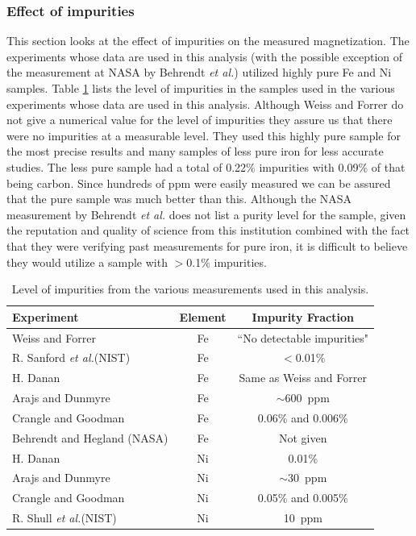 \documentclass[12pt]{article}
\begin{document}
\subsubsection{Effect of impurities}
This section looks at the effect of impurities on the measured magnetization. The experiments whose data are used in this analysis (with the possible exception of the measurement at NASA by Behrendt {\it et al.}) utilized highly pure Fe and Ni samples. Table \ref{tab:impurities} lists the level of impurities in the samples used in the various experiments whose data are used in this analysis. Although Weiss and Forrer \cite{Weiss1929} do not give a numerical value for the level of impurities they assure us that there were no impurities at a measurable level. They used this highly pure sample for the most precise results and many samples of less pure iron for less accurate studies. The less pure sample had a total of 0.22\% impurities with 0.09\% of that being carbon. Since hundreds of ppm were easily measured we can be assured that the pure sample was much better than this. Although the NASA measurement by Behrendt {\it et al.} does not list a purity level for the sample, given the reputation and quality of science from this institution combined with the fact that they were verifying past measurements for pure iron, it is difficult to believe they would utilize a sample with $>$0.1\% impurities.  
\begin{table}[htp]
\caption{Level of impurities from the various measurements used in this analysis.}
\begin{center}
\begin{tabular}{|l|c|c|}\hline
Experiment&Element&Impurity Fraction\\\hline
Weiss and Forrer \cite{Weiss1929} & Fe&``No detectable impurities"\\
R. Sanford {\it et al.}(NIST)\cite{Sanford1941} & Fe&$<$0.01\%\\
H. Danan \cite{Danan1959, Danan1968}& Fe&Same as Weiss and Forrer\\
Arajs and Dunmyre \cite{Arajs1964}\cite{Arajs1967}&Fe& $\sim$600~ppm\\
Crangle and Goodman \cite{Crangle1971} & Fe & 0.06\% and 0.006\%\\
Behrendt and Hegland (NASA)\cite{Behrendt1972} & Fe & Not given\\\hline
H. Danan \cite{Danan1959, Danan1968} & Ni&0.01\% \\
Arajs and Dunmyre \cite{Arajs1963, Arajs1965, Arajs1967}&Ni& $\sim$30~ppm\\
Crangle and Goodman \cite{Crangle1971} & Ni & 0.05\% and 0.005\%\\
R. Shull {\it et al.}(NIST) & Ni & 10~ppm\\\hline
\end{tabular}
\end{center}
\label{tab:impurities}
\end{table}%
\end{document}
